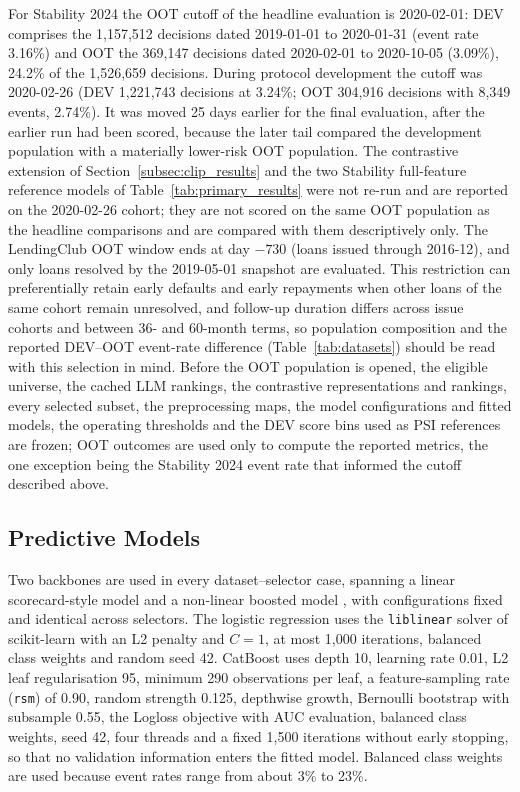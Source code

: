 \documentclass[final,5p,twocolumn]{elsarticle}
\begin{document}
For Stability 2024 the OOT cutoff of the headline evaluation is 2020-02-01: DEV comprises the 1,157,512 decisions dated 2019-01-01 to 2020-01-31 (event rate 3.16\%) and OOT the 369,147 decisions dated 2020-02-01 to 2020-10-05 (3.09\%), 24.2\% of the 1,526,659 decisions. During protocol development the cutoff was 2020-02-26 (DEV 1,221,743 decisions at 3.24\%; OOT 304,916 decisions with 8,349 events, 2.74\%). It was moved 25 days earlier for the final evaluation, after the earlier run had been scored, because the later tail compared the development population with a materially lower-risk OOT population. The contrastive extension of Section~\ref{subsec:clip_results} and the two Stability full-feature reference models of Table~\ref{tab:primary_results} were not re-run and are reported on the 2020-02-26 cohort; they are not scored on the same OOT population as the headline comparisons and are compared with them descriptively only. The LendingClub OOT window ends at day $-730$ (loans issued through 2016-12), and only loans resolved by the 2019-05-01 snapshot are evaluated. This restriction can preferentially retain early defaults and early repayments when other loans of the same cohort remain unresolved, and follow-up duration differs across issue cohorts and between 36- and 60-month terms, so population composition and the reported DEV--OOT event-rate difference (Table~\ref{tab:datasets}) should be read with this selection in mind. Before the OOT population is opened, the eligible universe, the cached LLM rankings, the contrastive representations and rankings, every selected subset, the preprocessing maps, the model configurations and fitted models, the operating thresholds and the DEV score bins used as PSI references are frozen; OOT outcomes are used only to compute the reported metrics, the one exception being the Stability 2024 event rate that informed the cutoff described above.

\subsection{Predictive Models}
\label{subsec:models}

Two backbones are used in every dataset--selector case, spanning a linear scorecard-style model and a non-linear boosted model \cite{lessmann2015,gunnarsson2021}, with configurations fixed and identical across selectors. The logistic regression uses the \texttt{liblinear} solver of scikit-learn \cite{pedregosa2011} with an L2 penalty and $C=1$, at most 1,000 iterations, balanced class weights and random seed 42. CatBoost \cite{prokhorenkova2018} uses depth 10, learning rate 0.01, L2 leaf regularisation 95, minimum 290 observations per leaf, a feature-sampling rate (\texttt{rsm}) of 0.90, random strength 0.125, depthwise growth, Bernoulli bootstrap with subsample 0.55, the Logloss objective with AUC evaluation, balanced class weights, seed 42, four threads and a fixed 1,500 iterations without early stopping, so that no validation information enters the fitted model. Balanced class weights are used because event rates range from about 3\% to 23\%.
\end{document}
